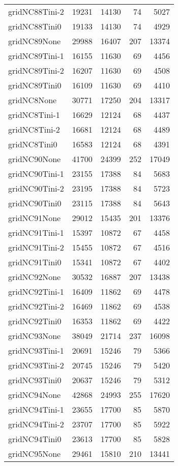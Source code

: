 \begin{longtable}{lrrrr}
gridNC88Tini-2 & 19231 & 14130 & 74 & 5027 \\
gridNC88Tini0 & 19133 & 14130 & 74 & 4929 \\
gridNC89None & 29988 & 16407 & 207 & 13374 \\
gridNC89Tini-1 & 16155 & 11630 & 69 & 4456 \\
gridNC89Tini-2 & 16207 & 11630 & 69 & 4508 \\
gridNC89Tini0 & 16109 & 11630 & 69 & 4410 \\
gridNC8None & 30771 & 17250 & 204 & 13317 \\
gridNC8Tini-1 & 16629 & 12124 & 68 & 4437 \\
gridNC8Tini-2 & 16681 & 12124 & 68 & 4489 \\
gridNC8Tini0 & 16583 & 12124 & 68 & 4391 \\
gridNC90None & 41700 & 24399 & 252 & 17049 \\
gridNC90Tini-1 & 23155 & 17388 & 84 & 5683 \\
gridNC90Tini-2 & 23195 & 17388 & 84 & 5723 \\
gridNC90Tini0 & 23115 & 17388 & 84 & 5643 \\
gridNC91None & 29012 & 15435 & 201 & 13376 \\
gridNC91Tini-1 & 15397 & 10872 & 67 & 4458 \\
gridNC91Tini-2 & 15455 & 10872 & 67 & 4516 \\
gridNC91Tini0 & 15341 & 10872 & 67 & 4402 \\
gridNC92None & 30532 & 16887 & 207 & 13438 \\
gridNC92Tini-1 & 16409 & 11862 & 69 & 4478 \\
gridNC92Tini-2 & 16469 & 11862 & 69 & 4538 \\
gridNC92Tini0 & 16353 & 11862 & 69 & 4422 \\
gridNC93None & 38049 & 21714 & 237 & 16098 \\
gridNC93Tini-1 & 20691 & 15246 & 79 & 5366 \\
gridNC93Tini-2 & 20745 & 15246 & 79 & 5420 \\
gridNC93Tini0 & 20637 & 15246 & 79 & 5312 \\
gridNC94None & 42868 & 24993 & 255 & 17620 \\
gridNC94Tini-1 & 23655 & 17700 & 85 & 5870 \\
gridNC94Tini-2 & 23707 & 17700 & 85 & 5922 \\
gridNC94Tini0 & 23613 & 17700 & 85 & 5828 \\
gridNC95None & 29461 & 15810 & 210 & 13441 \\

\end{longtable}
